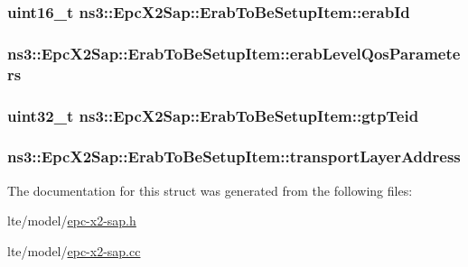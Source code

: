 \subsubsection[{\texorpdfstring{erab\+Id}{erabId}}]{\setlength{\rightskip}{0pt plus 5cm}uint16\+\_\+t ns3\+::\+Epc\+X2\+Sap\+::\+Erab\+To\+Be\+Setup\+Item\+::erab\+Id}\hypertarget{structns3_1_1EpcX2Sap_1_1ErabToBeSetupItem_ad59a72b6e684ebc2074a73d03821fa68}{}\label{structns3_1_1EpcX2Sap_1_1ErabToBeSetupItem_ad59a72b6e684ebc2074a73d03821fa68}
\subsubsection[{\texorpdfstring{erab\+Level\+Qos\+Parameters}{erabLevelQosParameters}}]{ ns3\+::\+Epc\+X2\+Sap\+::\+Erab\+To\+Be\+Setup\+Item\+::erab\+Level\+Qos\+Parameters}\hypertarget{structns3_1_1EpcX2Sap_1_1ErabToBeSetupItem_addb4e7d6b05b3e9365ed230e343cbf0b}{}\label{structns3_1_1EpcX2Sap_1_1ErabToBeSetupItem_addb4e7d6b05b3e9365ed230e343cbf0b}
\subsubsection[{\texorpdfstring{gtp\+Teid}{gtpTeid}}]{\setlength{\rightskip}{0pt plus 5cm}uint32\+\_\+t ns3\+::\+Epc\+X2\+Sap\+::\+Erab\+To\+Be\+Setup\+Item\+::gtp\+Teid}\hypertarget{structns3_1_1EpcX2Sap_1_1ErabToBeSetupItem_ad6013b682fcacabf1e94a67c7e21118e}{}\label{structns3_1_1EpcX2Sap_1_1ErabToBeSetupItem_ad6013b682fcacabf1e94a67c7e21118e}
\subsubsection[{\texorpdfstring{transport\+Layer\+Address}{transportLayerAddress}}]{ ns3\+::\+Epc\+X2\+Sap\+::\+Erab\+To\+Be\+Setup\+Item\+::transport\+Layer\+Address}\hypertarget{structns3_1_1EpcX2Sap_1_1ErabToBeSetupItem_aa50ff6a3143234c9b2e22bbbd7d5b7a9}{}\label{structns3_1_1EpcX2Sap_1_1ErabToBeSetupItem_aa50ff6a3143234c9b2e22bbbd7d5b7a9}


The documentation for this struct was generated from the following files\+:\begin{DoxyCompactItemize}
\item 
lte/model/\hyperlink{epc-x2-sap_8h}{epc-\/x2-\/sap.\+h}\item 
lte/model/\hyperlink{epc-x2-sap_8cc}{epc-\/x2-\/sap.\+cc}\end{DoxyCompactItemize}
